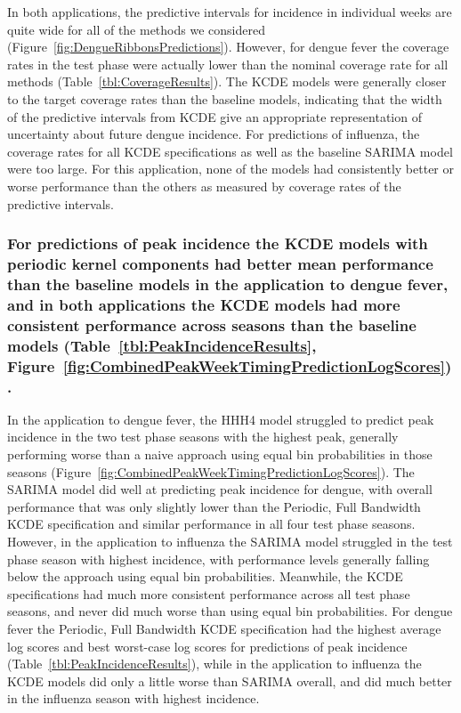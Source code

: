 \documentclass[times, doublespace]{simauth}\usepackage[]{graphicx}\usepackage[]{color}
\begin{document}

In both applications, the predictive intervals for incidence in individual weeks are quite wide for all of the methods we considered (Figure~\ref{fig:DengueRibbonsPredictions}).  However, for dengue fever the coverage rates in the test phase were actually lower than the nominal coverage rate for all methods (Table~\ref{tbl:CoverageResults}).  The KCDE models were generally closer to the target coverage rates than the baseline models, indicating that the width of the predictive intervals from KCDE give an appropriate representation of uncertainty about future dengue incidence.  For predictions of influenza, the coverage rates for all KCDE specifications as well as the baseline SARIMA model were too large.  For this application, none of the models had consistently better or worse performance than the others as measured by coverage rates of the predictive intervals.


\subsubsection{For predictions of peak incidence the KCDE models with periodic
kernel components had better mean performance than the baseline models in the
application to dengue fever, and in both applications the KCDE models had more
consistent performance across seasons than the baseline models
(Table~\ref{tbl:PeakIncidenceResults}, Figure~\ref{fig:CombinedPeakWeekTimingPredictionLogScores}).}
In the application to dengue fever, the HHH4 model struggled to predict peak
incidence in the two test phase seasons with the highest peak, generally
performing worse than a naive approach using equal bin probabilities in those
seasons (Figure~\ref{fig:CombinedPeakWeekTimingPredictionLogScores}).  The
SARIMA model did well at predicting peak incidence for dengue, with overall
performance that was only slightly lower than the Periodic, Full Bandwidth KCDE
specification and similar performance in all four test phase seasons.  However,
in the application to influenza the SARIMA model struggled in the test phase
season with highest incidence, with performance levels generally falling below
the approach using equal bin probabilities.  Meanwhile, the KCDE specifications
had much more consistent performance across all test phase seasons, and never
did much worse than using equal bin probabilities.  For dengue fever the
Periodic, Full Bandwidth KCDE specification had the highest average log scores
and best worst-case log scores for predictions of peak incidence (Table~\ref{tbl:PeakIncidenceResults}), while
in the application to influenza the KCDE models did only a little worse than
SARIMA overall, and did much better in the influenza season with highest incidence.
\end{document}
